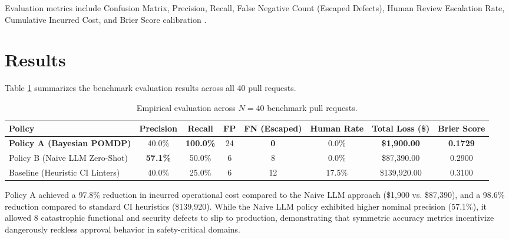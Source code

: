 \documentclass[10pt,twocolumn,letterpaper]{article}
\begin{document}
Evaluation metrics include Confusion Matrix, Precision, Recall, False Negative Count (Escaped Defects), Human Review Escalation Rate, Cumulative Incurred Cost, and Brier Score calibration \cite{brier1950verification}.

\section{Results}
Table \ref{tab:results} summarizes the benchmark evaluation results across all 40 pull requests.

\begin{table}[t]
\centering
\small
\begin{tabular}{lccccccc}
\toprule
\textbf{Policy} & \textbf{Precision} & \textbf{Recall} & \textbf{FP} & \textbf{FN (Escaped)} & \textbf{Human Rate} & \textbf{Total Loss (\$)} & \textbf{Brier Score} \\
\midrule
\textbf{Policy A (Bayesian POMDP)} & 40.0\% & \textbf{100.0\%} & 24 & \textbf{0} & 0.0\% & \textbf{\$1,900.00} & \textbf{0.1729} \\
Policy B (Naive LLM Zero-Shot) & \textbf{57.1\%} & 50.0\% & 6 & 8 & 0.0\% & \$87,390.00 & 0.2900 \\
Baseline (Heuristic CI Linters) & 40.0\% & 25.0\% & 6 & 12 & 17.5\% & \$139,920.00 & 0.3100 \\
\bottomrule
\end{tabular}
\caption{Empirical evaluation across $N=40$ benchmark pull requests.}
\label{tab:results}
\end{table}

Policy A achieved a 97.8\% reduction in incurred operational cost compared to the Naive LLM approach (\$1,900 vs. \$87,390), and a 98.6\% reduction compared to standard CI heuristics (\$139,920). While the Naive LLM policy exhibited higher nominal precision (57.1\%), it allowed 8 catastrophic functional and security defects to slip to production, demonstrating that symmetric accuracy metrics incentivize dangerously reckless approval behavior in safety-critical domains.
\end{document}
